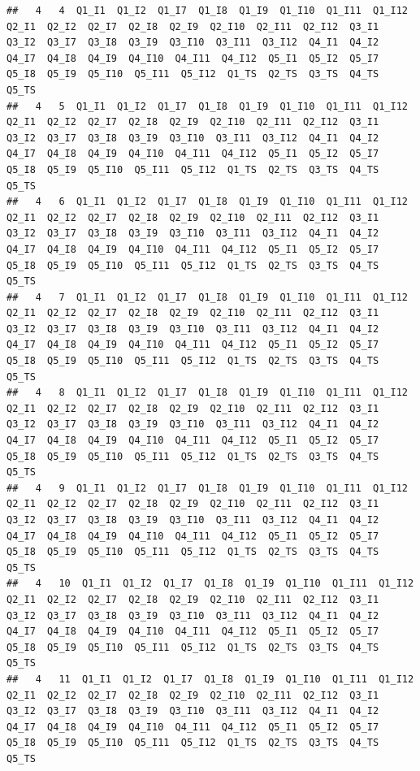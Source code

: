 \documentclass[
]{book}
\begin{document}
\begin{verbatim}
##   4   4  Q1_I1  Q1_I2  Q1_I7  Q1_I8  Q1_I9  Q1_I10  Q1_I11  Q1_I12  Q2_I1  Q2_I2  Q2_I7  Q2_I8  Q2_I9  Q2_I10  Q2_I11  Q2_I12  Q3_I1  Q3_I2  Q3_I7  Q3_I8  Q3_I9  Q3_I10  Q3_I11  Q3_I12  Q4_I1  Q4_I2  Q4_I7  Q4_I8  Q4_I9  Q4_I10  Q4_I11  Q4_I12  Q5_I1  Q5_I2  Q5_I7  Q5_I8  Q5_I9  Q5_I10  Q5_I11  Q5_I12  Q1_TS  Q2_TS  Q3_TS  Q4_TS  Q5_TS
##   4   5  Q1_I1  Q1_I2  Q1_I7  Q1_I8  Q1_I9  Q1_I10  Q1_I11  Q1_I12  Q2_I1  Q2_I2  Q2_I7  Q2_I8  Q2_I9  Q2_I10  Q2_I11  Q2_I12  Q3_I1  Q3_I2  Q3_I7  Q3_I8  Q3_I9  Q3_I10  Q3_I11  Q3_I12  Q4_I1  Q4_I2  Q4_I7  Q4_I8  Q4_I9  Q4_I10  Q4_I11  Q4_I12  Q5_I1  Q5_I2  Q5_I7  Q5_I8  Q5_I9  Q5_I10  Q5_I11  Q5_I12  Q1_TS  Q2_TS  Q3_TS  Q4_TS  Q5_TS
##   4   6  Q1_I1  Q1_I2  Q1_I7  Q1_I8  Q1_I9  Q1_I10  Q1_I11  Q1_I12  Q2_I1  Q2_I2  Q2_I7  Q2_I8  Q2_I9  Q2_I10  Q2_I11  Q2_I12  Q3_I1  Q3_I2  Q3_I7  Q3_I8  Q3_I9  Q3_I10  Q3_I11  Q3_I12  Q4_I1  Q4_I2  Q4_I7  Q4_I8  Q4_I9  Q4_I10  Q4_I11  Q4_I12  Q5_I1  Q5_I2  Q5_I7  Q5_I8  Q5_I9  Q5_I10  Q5_I11  Q5_I12  Q1_TS  Q2_TS  Q3_TS  Q4_TS  Q5_TS
##   4   7  Q1_I1  Q1_I2  Q1_I7  Q1_I8  Q1_I9  Q1_I10  Q1_I11  Q1_I12  Q2_I1  Q2_I2  Q2_I7  Q2_I8  Q2_I9  Q2_I10  Q2_I11  Q2_I12  Q3_I1  Q3_I2  Q3_I7  Q3_I8  Q3_I9  Q3_I10  Q3_I11  Q3_I12  Q4_I1  Q4_I2  Q4_I7  Q4_I8  Q4_I9  Q4_I10  Q4_I11  Q4_I12  Q5_I1  Q5_I2  Q5_I7  Q5_I8  Q5_I9  Q5_I10  Q5_I11  Q5_I12  Q1_TS  Q2_TS  Q3_TS  Q4_TS  Q5_TS
##   4   8  Q1_I1  Q1_I2  Q1_I7  Q1_I8  Q1_I9  Q1_I10  Q1_I11  Q1_I12  Q2_I1  Q2_I2  Q2_I7  Q2_I8  Q2_I9  Q2_I10  Q2_I11  Q2_I12  Q3_I1  Q3_I2  Q3_I7  Q3_I8  Q3_I9  Q3_I10  Q3_I11  Q3_I12  Q4_I1  Q4_I2  Q4_I7  Q4_I8  Q4_I9  Q4_I10  Q4_I11  Q4_I12  Q5_I1  Q5_I2  Q5_I7  Q5_I8  Q5_I9  Q5_I10  Q5_I11  Q5_I12  Q1_TS  Q2_TS  Q3_TS  Q4_TS  Q5_TS
##   4   9  Q1_I1  Q1_I2  Q1_I7  Q1_I8  Q1_I9  Q1_I10  Q1_I11  Q1_I12  Q2_I1  Q2_I2  Q2_I7  Q2_I8  Q2_I9  Q2_I10  Q2_I11  Q2_I12  Q3_I1  Q3_I2  Q3_I7  Q3_I8  Q3_I9  Q3_I10  Q3_I11  Q3_I12  Q4_I1  Q4_I2  Q4_I7  Q4_I8  Q4_I9  Q4_I10  Q4_I11  Q4_I12  Q5_I1  Q5_I2  Q5_I7  Q5_I8  Q5_I9  Q5_I10  Q5_I11  Q5_I12  Q1_TS  Q2_TS  Q3_TS  Q4_TS  Q5_TS
##   4   10  Q1_I1  Q1_I2  Q1_I7  Q1_I8  Q1_I9  Q1_I10  Q1_I11  Q1_I12  Q2_I1  Q2_I2  Q2_I7  Q2_I8  Q2_I9  Q2_I10  Q2_I11  Q2_I12  Q3_I1  Q3_I2  Q3_I7  Q3_I8  Q3_I9  Q3_I10  Q3_I11  Q3_I12  Q4_I1  Q4_I2  Q4_I7  Q4_I8  Q4_I9  Q4_I10  Q4_I11  Q4_I12  Q5_I1  Q5_I2  Q5_I7  Q5_I8  Q5_I9  Q5_I10  Q5_I11  Q5_I12  Q1_TS  Q2_TS  Q3_TS  Q4_TS  Q5_TS
##   4   11  Q1_I1  Q1_I2  Q1_I7  Q1_I8  Q1_I9  Q1_I10  Q1_I11  Q1_I12  Q2_I1  Q2_I2  Q2_I7  Q2_I8  Q2_I9  Q2_I10  Q2_I11  Q2_I12  Q3_I1  Q3_I2  Q3_I7  Q3_I8  Q3_I9  Q3_I10  Q3_I11  Q3_I12  Q4_I1  Q4_I2  Q4_I7  Q4_I8  Q4_I9  Q4_I10  Q4_I11  Q4_I12  Q5_I1  Q5_I2  Q5_I7  Q5_I8  Q5_I9  Q5_I10  Q5_I11  Q5_I12  Q1_TS  Q2_TS  Q3_TS  Q4_TS  Q5_TS

\end{verbatim}
\end{document}

